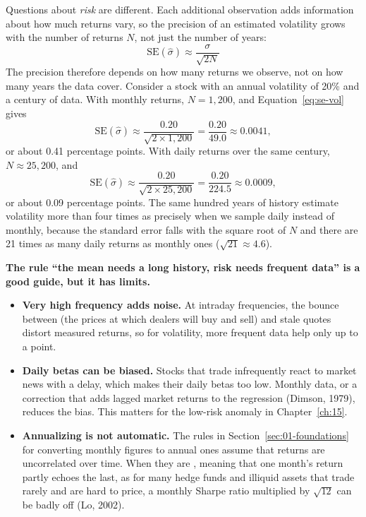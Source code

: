 \begin{technote}
Questions about \emph{risk} are different. Each additional observation adds information about how much returns vary, so the precision of an estimated volatility grows with the number of returns $N$, not just the number of years:
\begin{equation}
  \mathrm{SE}(\hat{\sigma}) \approx \frac{\sigma}{\sqrt{2N}} \nonumber
\end{equation}
The precision therefore depends on how many returns we observe, not on how
many years the data cover. Consider a stock with an annual volatility of
20\% 
and a century of data. With monthly returns, $N = 1{,}200$, and
Equation~\eqref{eq:se-vol} gives
\begin{equation}
  \mathrm{SE}(\hat{\sigma}) \approx \frac{0.20}{\sqrt{2 \times 1{,}200}}
  = \frac{0.20}{49.0} \approx 0.0041 ,
\end{equation}
or about 0.41 percentage points. With daily returns over the same century,
$N \approx 25{,}200$, and
\begin{equation}
  \mathrm{SE}(\hat{\sigma}) \approx \frac{0.20}{\sqrt{2 \times 25{,}200}}
  = \frac{0.20}{224.5} \approx 0.0009 ,
\end{equation}
or about 0.09 percentage points. The same hundred years of history estimate
volatility more than four times as precisely when we sample daily instead of
monthly, because the standard error falls with the square root of $N$ and
there are 21 times as many daily returns as monthly ones
($\sqrt{21} \approx 4.6$).



\textbf{The rule ``the mean needs a long history, risk needs frequent data'' is a good guide, but it has limits.}
\begin{itemize}
  \item \textbf{Very high frequency adds noise.} At intraday frequencies, the bounce between  (the prices at which dealers will buy and sell) and stale quotes distort measured returns, so for volatility, more frequent data help only up to a point.
  \item \textbf{Daily betas can be biased.} Stocks that trade infrequently react to market news with a delay, which makes their daily betas too low. Monthly data, or a correction that adds lagged market returns to the regression (Dimson, 1979), reduces the bias. This matters for the low-risk anomaly in Chapter~\ref{ch:15}.
  \item \textbf{Annualizing is not automatic.} The rules in Section~\ref{sec:01-foundations} for converting monthly figures to annual ones assume that returns are uncorrelated over time. When they are \label{kt:autocorrelated}, meaning that one month's return partly echoes the last, as for many hedge funds and illiquid assets that trade rarely and are hard to price, a monthly Sharpe ratio multiplied by $\sqrt{12}$ can be badly off (Lo, 2002).
\end{itemize}
\end{technote}

